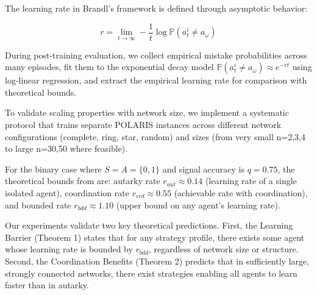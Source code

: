 \documentclass[a4paper,12pt]{report}
\begin{document}
The learning rate in Brandl's framework is defined through asymptotic behavior:

\begin{equation*}
    r = \lim_{t\to\infty} -\frac{1}{t}\log \mathbb{P}(a^i_t \neq a_\omega)
\end{equation*}

During post-training evaluation, we collect empirical mistake probabilities across many episodes, fit them to the exponential decay model $\mathbb{P}(a^i_t \neq a_\omega) \approx e^{-rt}$ using log-linear regression, and extract the empirical learning rate for comparison with theoretical bounds.

To validate scaling properties with network size, we implement a systematic protocol that trains separate POLARIS instances across different network configurations (complete, ring, star, random) and sizes (from very small n=2,3,4 to large n=30,50 where feasible).

For the binary case where $S = A = \{0,1\}$ and signal accuracy is $q = 0.75$, the theoretical bounds from \citet{brandl2024} are: autarky rate $r_{aut} \approx 0.14$ (learning rate of a single isolated agent), coordination rate $r_{crd} \approx 0.55$ (achievable rate with coordination), and bounded rate $r_{bdd} \approx 1.10$ (upper bound on any agent's learning rate).

Our experiments validate two key theoretical predictions. First, the Learning Barrier (Theorem 1) states that for any strategy profile, there exists some agent whose learning rate is bounded by $r_{bdd}$, regardless of network size or structure. Second, the Coordination Benefits (Theorem 2) predicts that in sufficiently large, strongly connected networks, there exist strategies enabling all agents to learn faster than in autarky.

\end{document}
